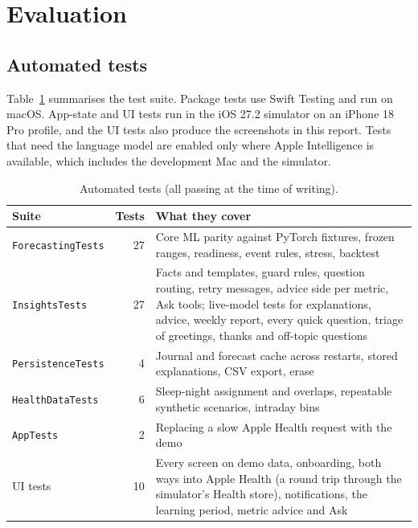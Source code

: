 \documentclass[11pt,a4paper]{article}
\begin{document}
\section{Evaluation}\label{sec:eval}

\subsection{Automated tests}
Table~\ref{tab:tests} summarises the test suite. Package tests use Swift Testing and run on macOS. App-state and UI tests run in the iOS 27.2 simulator on an iPhone 18 Pro profile, and the UI tests also produce the screenshots in this report. Tests that need the language model are enabled only where Apple Intelligence is available, which includes the development Mac and the simulator.

\begin{table}[t]
  \centering\small
  \caption{Automated tests (all passing at the time of writing).}
  \label{tab:tests}
  \begin{tabular}{lrp{9.4cm}}
    \toprule
    Suite & Tests & What they cover \\
    \midrule
    \texttt{ForecastingTests} & 27 & Core ML parity against PyTorch fixtures, frozen ranges, readiness, event rules, stress, backtest \\
    \texttt{InsightsTests} & 27 & Facts and templates, guard rules, question routing, retry messages, advice side per metric, Ask tools; live-model tests for explanations, advice, weekly report, every quick question, triage of greetings, thanks and off-topic questions \\
    \texttt{PersistenceTests} & 4 & Journal and forecast cache across restarts, stored explanations, CSV export, erase \\
    \texttt{HealthDataTests} & 6 & Sleep-night assignment and overlaps, repeatable synthetic scenarios, intraday bins \\
    \texttt{AppTests} & 2 & Replacing a slow Apple Health request with the demo \\
    UI tests & 10 & Every screen on demo data, onboarding, both ways into Apple Health (a round trip through the simulator's Health store), notifications, the learning period, metric advice and Ask \\
    \bottomrule
  \end{tabular}
\end{table}
\end{document}
